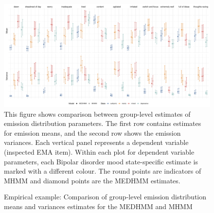 
\begin{figure}
    \centering    
    \caption{Empirical example: Comparison of group-level emission distribution means and variances estimates for the MEDHMM and MHMM}
 \includegraphics[scale=0.6]{graphics/comparison_emiss_group_level2.pdf}
 \flushleft
 \footnotesize
 \justifying
 This figure shows comparison between group-level estimates of emission distribution parameters. The first row contains estimates for emission means, and the second row shows the emission variances. Each vertical panel represents a dependent variable (inspected EMA item). Within each plot for dependent variable parameters, each Bipolar disorder mood state-specific estimate is marked with a different colour. The round points are indicators of MHMM and diamond points are the MEDHMM estimates. 
    \label{group_emission_emp}
\end{figure}

